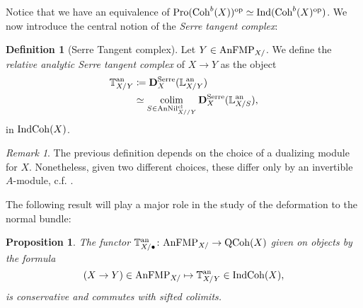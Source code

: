 \documentclass[10pt,a4paper,reqno]{amsart} %
\theoremstyle{plain}
\newtheorem{prop}[thm]{Proposition}
\theoremstyle{definition}
\newtheorem{defin}[thm]{Definition}
\theoremstyle{remark}
\newtheorem{rem}[thm]{Remark}
\numberwithin{equation}{section}
\begin{document}
Notice that we have an equivalence of \infcats $\mathrm{Pro}(\mathrm{Coh}^b(X)) ^\mathrm{op} \simeq \mathrm{Ind}(\mathrm{Coh}^b(X) ^\mathrm{op})$. We now introduce the central notion
of the \emph{Serre tangent complex}:

\begin{defin}[Serre Tangent complex] Let $Y \in \mathrm{AnFMP}_{X/}$. We define the \emph{relative analytic Serre tangent complex} of $X \to Y$ as the object
    \begin{align*}
        \mathbb T^\mathrm{an}_{X/ Y}  & \coloneqq \mathbf D^\mathrm{Serre}_{X}(\mathbb L^\mathrm{an}_{X/Y}) \\
                        & \simeq \operatorname*{colim}_{S \in \mathrm{AnNil}^{\mathrm{cl}}_{X/ /Y}} \mathbf D^\mathrm{Serre}_X(\mathbb L^\mathrm{an}_{X/S}),
    \end{align*}
    in $\mathrm{Ind}\mathrm{Coh}(X)$.
\end{defin}

\begin{rem}
    The previous definition depends on the choice of a dualizing module for $X$. Nonetheless, given two different choices, these
    differ only
    by an invertible $A$-module, c.f. \cite[Proposition 2.4]{Antonio_Koszul}.
\end{rem}

The following result will play a major role in the study of the deformation to the normal bundle:

\begin{prop} \label{prop:conservativity_and_preservation_of_sifted_colimits_of_tangent_complex}
    The functor $\mathbb T^\mathrm{an}_{X/ \bullet} \colon \mathrm{AnFMP}_{X/} \to \mathrm{QCoh}(X)$ given on objects by the formula
        \[
            (X \to Y) \in \mathrm{AnFMP}_{X/} \mapsto \mathbb T^\mathrm{an}_{X/Y} \in \mathrm{Ind}\mathrm{Coh}(X), 
        \]
    is conservative and commutes with sifted colimits.
\end{prop}
\end{document}
